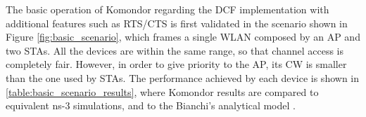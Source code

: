 \documentclass[a4paper]{article}
\begin{document}
%
		
	The basic operation of Komondor regarding the DCF implementation with additional features such as RTS/CTS is first validated in the scenario shown in Figure \ref{fig:basic_scenario}, which frames a single WLAN composed by an AP and two STAs. All the devices are within the same range, so that channel access is completely fair. However, in order to give priority to the AP, its CW is smaller than the one used by STAs. The performance achieved by each device is shown in \ref{table:basic_scenario_results}, where Komondor results are compared to equivalent ns-3 simulations, and to the Bianchi's analytical model \cite{bianchi2000performance}. 
	
\end{document}
